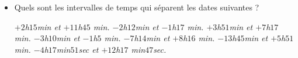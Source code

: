 \begin{itemize}
\begin{itemize}
\it $(a-b+c) - (d- e - f) + (b-a)$. 
\it $[(a-b)-(a-5)] + [b-7-(a-3)]$. 
\it $[12-(a-b)+6] - [15+ (b-a-13)]$. 
\end{itemize}
\it Quel est l'accroissement de la température indiquée 
par un thermomètre qui passe de $+7^o$ à $+13^o$, ou de $-3^o$ à $+1^o$, ou de $-5^o$ à $-7^o$, ou de $+3^o$ à $-1^o$ ?
\item Quels sont les intervalles de temps qui séparent les dates suivantes ? 
\begin{itemize}
\it $+2$h$15$min et $+11$h$45$ min. 
\it $-2$h$12$min et $-1$h$17$ min. 
\it $+3$h$51$min et $+7$h$17$ min. 
\it $-3$h$10$min et $-1$h$5$ min. 
\it $-7$h$14$min et $+8$h$16$ min. 
\it $-13$h$45$min et $+5$h$51$ min. 
\it $-4$h$17$min$51$sec et $+12$h$17$ min$47$sec. 
\end{itemize}
\end{itemize}